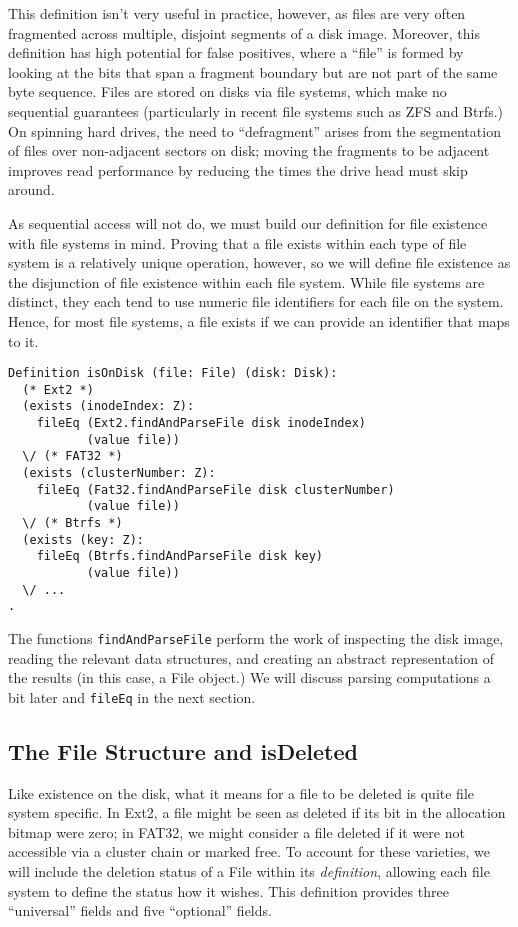 \documentclass[nocopyrightspace]{sigplanconf}
\begin{document}
This definition isn't very useful in practice, however, as files are very
often fragmented across multiple, disjoint segments of a disk image. Moreover,
this definition has high potential for false positives, where a ``file'' is
formed by looking at the bits that span a fragment boundary but are not part
of the same byte sequence. Files are stored on disks via file systems, which
make no sequential guarantees (particularly in recent file systems such as ZFS
and Btrfs.) On spinning hard drives, the need to ``defragment'' arises from
the segmentation of files over non-adjacent sectors on disk; moving the
fragments to be adjacent improves read performance by reducing the times the
drive head must skip around.

As sequential access will not do, we must build our definition for file
existence with file systems in mind. Proving that a file exists within each
type of file system is a relatively unique operation, however, so we will
define file existence as the disjunction of file existence within each file
system. While file systems are distinct, they each tend to use numeric file
identifiers for each file on the system. Hence, for most file systems, a file
exists if we can provide an identifier that maps to it.

\begin{lstlisting}
Definition isOnDisk (file: File) (disk: Disk):
  (* Ext2 *)
  (exists (inodeIndex: Z):
    fileEq (Ext2.findAndParseFile disk inodeIndex)
           (value file))
  \/ (* FAT32 *)
  (exists (clusterNumber: Z):
    fileEq (Fat32.findAndParseFile disk clusterNumber) 
           (value file))
  \/ (* Btrfs *)
  (exists (key: Z):
    fileEq (Btrfs.findAndParseFile disk key)
           (value file))
  \/ ...
.
\end{lstlisting}

The functions {\tt findAndParseFile} perform the work of inspecting the disk
image, reading the relevant data structures, and creating an abstract
representation of the results (in this case, a File object.) We will discuss
parsing computations a bit later and {\tt fileEq} in the next section.

\subsection{The File Structure and isDeleted}

Like existence on the disk, what it means for a file to be deleted is quite
file system specific. In Ext2, a file might be seen as deleted if its bit in
the allocation bitmap were zero; in FAT32, we might consider a file deleted if
it were not accessible via a cluster chain or marked free. To account for
these varieties, we will include the deletion status of a File within its {\em
definition}, allowing each file system to define the status how it wishes.
This definition provides three ``universal'' fields and five ``optional''
fields.
\end{document}
